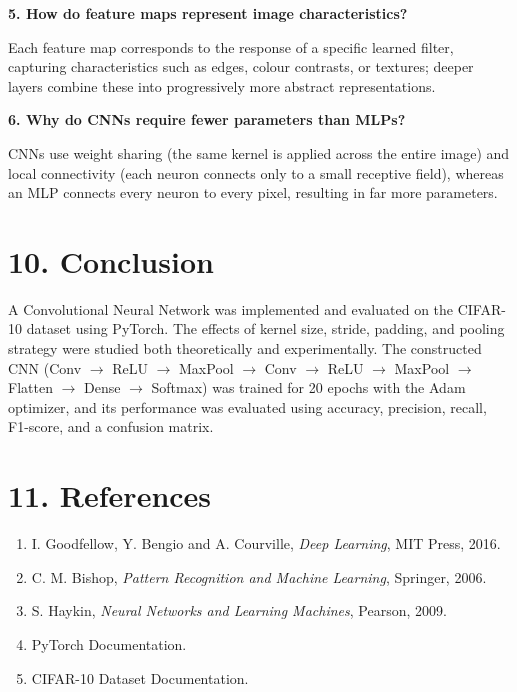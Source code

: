 \documentclass[11pt]{article}
\begin{document}
\textbf{5. How do feature maps represent image characteristics?}

Each feature map corresponds to the response of a specific learned filter, capturing characteristics such as edges, colour contrasts, or textures; deeper layers combine these into progressively more abstract representations.

\textbf{6. Why do CNNs require fewer parameters than MLPs?}

CNNs use weight sharing (the same kernel is applied across the entire image) and local connectivity (each neuron connects only to a small receptive field), whereas an MLP connects every neuron to every pixel, resulting in far more parameters.


\section*{10. Conclusion}

A Convolutional Neural Network was implemented and evaluated on the CIFAR-10 dataset using PyTorch. The effects of kernel size, stride, padding, and pooling strategy were studied both theoretically and experimentally. The constructed CNN (Conv $\rightarrow$ ReLU $\rightarrow$ MaxPool $\rightarrow$ Conv $\rightarrow$ ReLU $\rightarrow$ MaxPool $\rightarrow$ Flatten $\rightarrow$ Dense $\rightarrow$ Softmax) was trained for 20 epochs with the Adam optimizer, and its performance was evaluated using accuracy, precision, recall, F1-score, and a confusion matrix.


\section*{11. References}

\begin{enumerate}
\item I. Goodfellow, Y. Bengio and A. Courville, \emph{Deep Learning}, MIT Press, 2016.
\item C. M. Bishop, \emph{Pattern Recognition and Machine Learning}, Springer, 2006.
\item S. Haykin, \emph{Neural Networks and Learning Machines}, Pearson, 2009.
\item PyTorch Documentation.
\item CIFAR-10 Dataset Documentation.
\end{enumerate}
\end{document}
